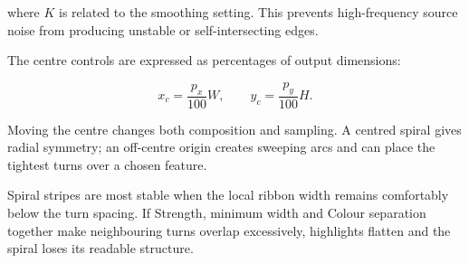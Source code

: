 where $K$ is related to the smoothing setting. This prevents high-frequency source noise from producing unstable or self-intersecting edges.

The centre controls are expressed as percentages of output dimensions:

\begin{equation}
x_c=\frac{p_x}{100}W,
\qquad
y_c=\frac{p_y}{100}H.
\end{equation}

Moving the centre changes both composition and sampling. A centred spiral gives radial symmetry; an off-centre origin creates sweeping arcs and can place the tightest turns over a chosen feature.

\begin{tipbox}
Spiral stripes are most stable when the local ribbon width remains comfortably below the turn spacing. If Strength, minimum width and Colour separation together make neighbouring turns overlap excessively, highlights flatten and the spiral loses its readable structure.
\end{tipbox}



